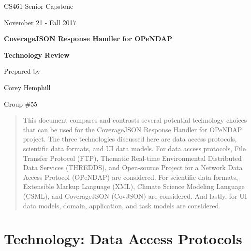 \documentclass[onecolumn, draftclsnofoot,10pt, compsoc]{IEEEtran}
\def \CapstoneProjectName{CoverageJSON Response Handler for OPeNDAP}
\def \DocumentName{Technology Review}
\begin{document}
\begin{titlepage}
    \begin{singlespace}
        \hfill    
        \par\vspace{.2in}
        \centering
        \scshape{
            \huge CS461 Senior Capstone \par
            {\large November 21 - Fall 2017}\par
            \vspace{.5in}
            \textbf{\Huge\CapstoneProjectName}\par
                        \vspace{.5in}
            \textbf{\Huge\DocumentName}\par
                        \vspace{.5in}
			{\large Prepared by }\par
            {\large Corey Hemphill }\par
            {\large Group \#55 }\par
            \par\vspace{1.0in}
        }
        \begin{abstract}
        \centering
        \noindent This document compares and contrasts several potential technology choices that can be used for the CoverageJSON Response Handler for OPeNDAP project. The three technologies discussed here are data access protocols, scientific data formats, and UI data models. For data access protocols, File Transfer Protocol (FTP), Thematic Real-time Environmental Distributed Data Services (THREDDS), and Open-source Project for a Network Data Access Protocol (OPeNDAP) are considered. For scientific data formats, Extensible Markup Language (XML), Climate Science Modeling Language (CSML), and CoverageJSON (CovJSON) are considered. And lastly, for UI data models, domain, application, and task models are considered.
        \end{abstract}
    \end{singlespace}
\end{titlepage}
\newpage
{}
\clearpage


    

\section{Technology: Data Access Protocols}
\end{document}
